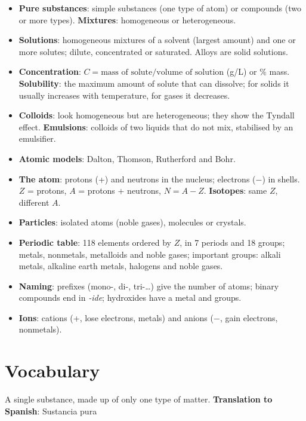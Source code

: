 \begin{itemize}
    \item \textbf{Pure substances}: simple substances (one type of atom) or compounds (two or more types). \textbf{Mixtures}: homogeneous or heterogeneous.
    \item \textbf{Solutions}: homogeneous mixtures of a solvent (largest amount) and one or more solutes; dilute, concentrated or saturated. Alloys are solid solutions.
    \item \textbf{Concentration}: \(C = \text{mass of solute}/\text{volume of solution}\) (g/L) or \% mass. \textbf{Solubility}: the maximum amount of solute that can dissolve; for solids it usually increases with temperature, for gases it decreases.
    \item \textbf{Colloids}: look homogeneous but are heterogeneous; they show the Tyndall effect. \textbf{Emulsions}: colloids of two liquids that do not mix, stabilised by an emulsifier.
    \item \textbf{Atomic models}: Dalton, Thomson, Rutherford and Bohr.
    \item \textbf{The atom}: protons (+) and neutrons in the nucleus; electrons (\(-\)) in shells. \(Z\) = protons, \(A\) = protons + neutrons, \(N = A - Z\). \textbf{Isotopes}: same \(Z\), different \(A\).
    \item \textbf{Particles}: isolated atoms (noble gases), molecules or crystals.
    \item \textbf{Periodic table}: 118 elements ordered by \(Z\), in 7 periods and 18 groups; metals, nonmetals, metalloids and noble gases; important groups: alkali metals, alkaline earth metals, halogens and noble gases.
    \item \textbf{Naming}: prefixes (mono-, di-, tri-\ldots) give the number of atoms; binary compounds end in \textit{-ide}; hydroxides have a metal and  groups.
    \item \textbf{Ions}: cations (+, lose electrons, metals) and anions (\(-\), gain electrons, nonmetals).
\end{itemize}

\section{Vocabulary}

\begin{vocabulary}
    A single substance, made up of only one type of matter. \newline
    \textbf{Translation to Spanish}: Sustancia pura
\end{vocabulary}

